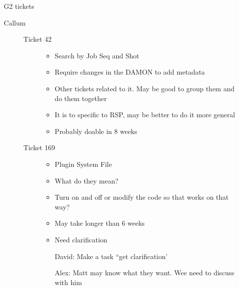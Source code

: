 \documentclass[a4paper,10pt]{article}
\begin{document}
\begin{enumerate}
\begin{description}
 	\end{description}
 	
 \item[G2 tickets]\begin{description}
                   \item[Callum] \begin{description}
                                  \item [Ticket 42]\begin{itemize}
                                            \item Search by Job Seq and Shot
                                            \item Require changes in the DAMON to add metadata
                                            \item Other tickets related to it.  May be good to group them and do them together
                                            \item It is to specific to RSP, may be better to do it more general
                                            \item Probably doable in 8 weeks
                                           \end{itemize}
                                  \item[Ticket 169]\begin{itemize}
                                             \item Plugin System File
                                             \item What do they mean?
                                             \item Turn on and off or modify the code so that works on that way?
                                             \item May take longer than 6 weeks
                                             \item Need clarification
                                             \item[David:] Make a task ``get clarification'
                                             \item [Alex:] Matt may know what they want.  Wee need to discuss with him
                                            \end{itemize}
                                  \end{description}
                   \end{description}
                                            

\end{enumerate}
\end{document}
